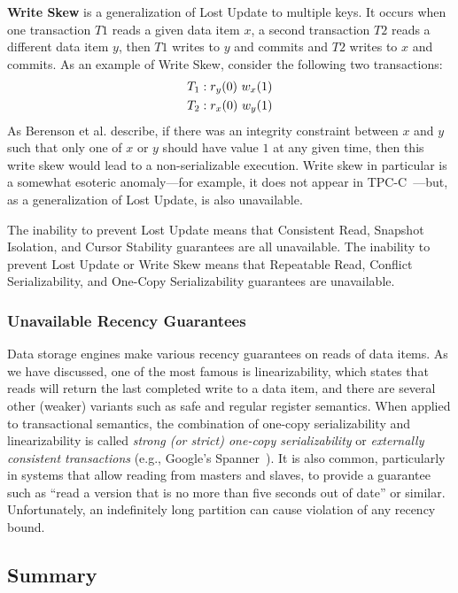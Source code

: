 \textbf{Write Skew} is a generalization of Lost Update to multiple
keys. It occurs when one transaction $T1$ reads a given data item $x$,
a second transaction $T2$ reads a different data item $y$, then $T1$
writes to $y$ and commits and $T2$ writes to $x$ and commits. As an
example of Write Skew, consider the following two transactions:
\begin{align*}
\small
T_1 &: r_y(0)~w_x(1)
\\T_2 &: r_x(0)~w_y(1)
\end{align*}
As Berenson et al. describe, if there was an integrity constraint
between $x$ and $y$ such that only one of $x$ or $y$ should have value
$1$ at any given time, then this write skew would lead to a
non-serializable execution. Write skew in particular is a somewhat
esoteric anomaly---for example, it does not appear in
TPC-C~\cite{snapshot-serializable}---but, as a generalization of Lost
Update, is also unavailable.

The inability to prevent Lost Update means that Consistent Read,
Snapshot Isolation, and Cursor Stability guarantees are all
unavailable. The inability to prevent Lost Update or Write Skew means
that Repeatable Read, Conflict Serializability, and One-Copy
Serializability guarantees are unavailable.

\subsubsection{Unavailable Recency Guarantees}

Data storage engines make various recency guarantees on reads of data
items. As we have discussed, one of the most famous is
linearizability, which states that reads will return the last
completed write to a data item, and there are several other (weaker)
variants such as safe and regular register semantics. When applied to
transactional semantics, the combination of one-copy serializability
and linearizability is called \textit{strong (or strict) one-copy
  serializability} or \textit{externally consistent transactions}
(e.g., Google's Spanner~\cite{spanner}). It is also common,
particularly in systems that allow reading from masters and slaves, to
provide a guarantee such as ``read a version that is no more than five
seconds out of date'' or similar. Unfortunately, an indefinitely long
partition can cause violation of any recency bound.

\subsection{Summary}
\label{sec:hat-summary}

